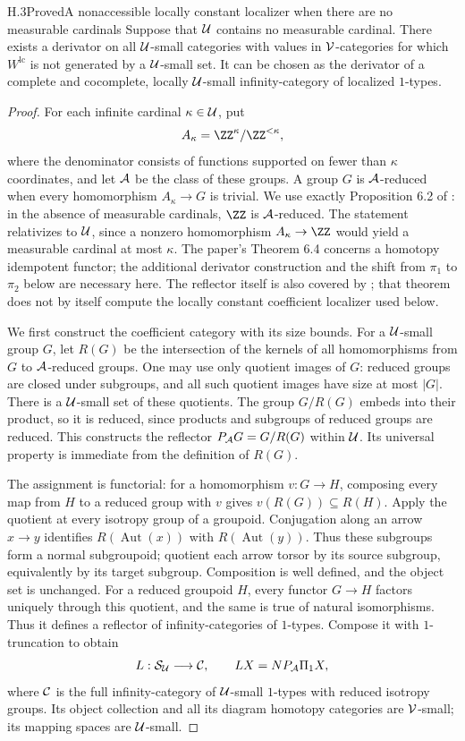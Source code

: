 \begin{claim}{H.3}{Proved}{A nonaccessible locally constant localizer when there are no measurable cardinals}
Suppose that $\mathcal U$ contains no measurable cardinal. There exists a derivator on all $\mathcal U$-small categories with values in $\mathcal V$-categories for which $W^{\mathrm{lc}}$ is not generated by a $\mathcal U$-small set. It can be chosen as the derivator of a complete and cocomplete, locally $\mathcal U$-small infinity-category of localized $1$-types.
\end{claim}
\begin{proof}
For each infinite cardinal $\kappa\in\mathcal U$, put
\[
 A_\kappa=\ZZ^\kappa/\ZZ^{<\kappa},
\]
where the denominator consists of functions supported on fewer than $\kappa$ coordinates, and let $\mathcal A$ be the class of these groups. A group $G$ is $\mathcal A$-reduced when every homomorphism $A_\kappa\to G$ is trivial. We use exactly Proposition 6.2 of \cite{FGHCSS2005}: in the absence of measurable cardinals, $\ZZ$ is $\mathcal A$-reduced. The statement relativizes to $\mathcal U$, since a nonzero homomorphism $A_\kappa\to\ZZ$ would yield a measurable cardinal at most $\kappa$. The paper's Theorem 6.4 concerns a homotopy idempotent functor; the additional derivator construction and the shift from $\pi_1$ to $\pi_2$ below are necessary here. The reflector itself is also covered by \cite[Theorem 3.3 with $n=1$, and Section 6.1]{FGHChristensen2024}; that theorem does not by itself compute the locally constant coefficient localizer used below.

We first construct the coefficient category with its size bounds. For a $\mathcal U$-small group $G$, let $R(G)$ be the intersection of the kernels of all homomorphisms from $G$ to $\mathcal A$-reduced groups. One may use only quotient images of $G$: reduced groups are closed under subgroups, and all such quotient images have size at most $|G|$. There is a $\mathcal U$-small set of these quotients. The group $G/R(G)$ embeds into their product, so it is reduced, since products and subgroups of reduced groups are reduced. This constructs the reflector $P_{\mathcal A} G=G/R(G)$ within $\mathcal U$. Its universal property is immediate from the definition of $R(G)$.

The assignment is functorial: for a homomorphism $v:G\to H$, composing every map from $H$ to a reduced group with $v$ gives $v(R(G))\subseteq R(H)$. Apply the quotient at every isotropy group of a groupoid. Conjugation along an arrow $x\to y$ identifies $R(\operatorname{Aut}(x))$ with $R(\operatorname{Aut}(y))$. Thus these subgroups form a normal subgroupoid; quotient each arrow torsor by its source subgroup, equivalently by its target subgroup. Composition is well defined, and the object set is unchanged. For a reduced groupoid $H$, every functor $G\to H$ factors uniquely through this quotient, and the same is true of natural isomorphisms. Thus it defines a reflector of infinity-categories of $1$-types. Compose it with $1$-truncation to obtain
\[
 L:\mathcal S_{\mathcal U}\longrightarrow\mathcal C,
 \qquad LX=NP_{\mathcal A}\Pi_1X,
\]
where $\mathcal C$ is the full infinity-category of $\mathcal U$-small $1$-types with reduced isotropy groups. Its object collection and all its diagram homotopy categories are $\mathcal V$-small; its mapping spaces are $\mathcal U$-small.


\end{proof}
